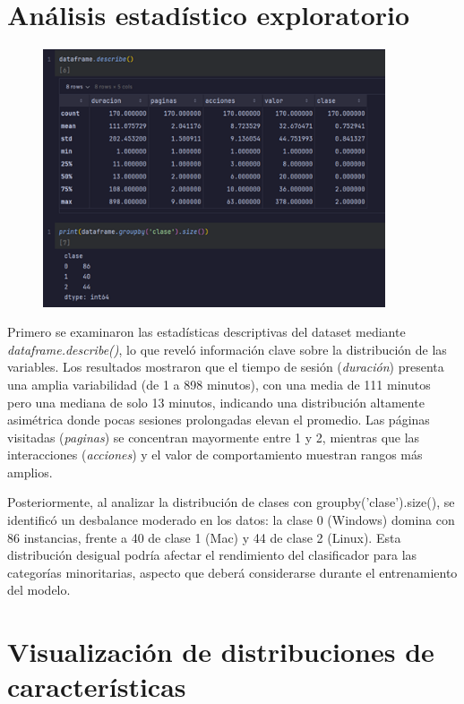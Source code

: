 \documentclass{article}
\begin{document}
\section*{Análisis estadístico exploratorio}

\begin{figure}[H]
\centering
\includegraphics[width=0.9\textwidth]{Actividad-11/Imagen2.png}
\end{figure}

Primero se examinaron las estadísticas descriptivas del dataset mediante \textit{dataframe.describe()}, lo que reveló información clave sobre la distribución de las variables. Los resultados mostraron que el tiempo de sesión (\textit{duración}) presenta una amplia variabilidad (de 1 a 898 minutos), con una media de 111 minutos pero una mediana de solo 13 minutos, indicando una distribución altamente asimétrica donde pocas sesiones prolongadas elevan el promedio. Las páginas visitadas (\textit{paginas}) se concentran mayormente entre 1 y 2, mientras que las interacciones (\textit{acciones}) y el valor de comportamiento muestran rangos más amplios.

Posteriormente, al analizar la distribución de clases con groupby('clase').size(), se identificó un desbalance moderado en los datos: la clase 0 (Windows) domina con 86 instancias, frente a 40 de clase 1 (Mac) y 44 de clase 2 (Linux). Esta distribución desigual podría afectar el rendimiento del clasificador para las categorías minoritarias, aspecto que deberá considerarse durante el entrenamiento del modelo.

\section*{Visualización de distribuciones de características}
\end{document}
